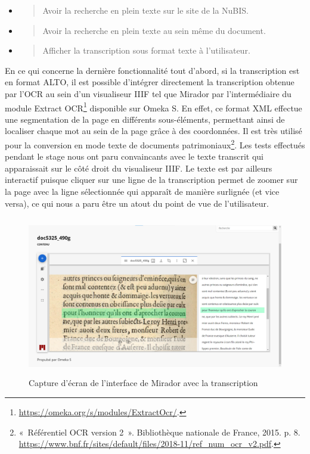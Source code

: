\documentclass[a4paper,12pt,twoside]{book}
\begin{document}
\begin{itemize}
	\item
	\begin{quote}
		Avoir la recherche en plein texte sur le site de la NuBIS.
	\end{quote}
	\item
	\begin{quote}
		Avoir la recherche en plein texte au sein même du document.
	\end{quote}
	\item
	\begin{quote}
		Afficher la transcription sous format texte à l'utilisateur. \\
	\end{quote}
\end{itemize}

En ce qui concerne la dernière fonctionnalité tout d'abord, si la
transcription est en format ALTO, il est possible d'intégrer directement
la transcription obtenue par l'OCR au sein d'un visualiseur IIIF tel que
Mirador par l'intermédiaire du module Extract OCR\footnote{\url{https://omeka.org/s/modules/ExtractOcr/}.}
disponible sur Omeka S. En effet, ce format XML effectue une
segmentation de la page en différents sous-éléments, permettant ainsi de
localiser chaque mot au sein de la page grâce à des coordonnées. Il est
très utilisé pour la conversion en mode texte de documents
patrimoniaux\footnote{«~Référentiel OCR version 2~». Bibliothèque
	nationale de France, 2015. p. 8.
	\url{https://www.bnf.fr/sites/default/files/2018-11/ref_num_ocr_v2.pdf}.}.
Les tests effectués pendant le stage nous ont paru convaincants avec le
texte transcrit qui apparaissait sur le côté droit du visualiseur IIIF.
Le texte est par ailleurs interactif puisque cliquer sur une ligne de la
transcription permet de zoomer sur la page avec la ligne sélectionnée
qui apparaît de manière surlignée (et vice versa), ce qui nous a paru
être un atout du point de vue de l'utilisateur. \\

\begin{figure} [H]
	\includegraphics[width=6.21736in,height=2.74514in]{vertopal_157ae480aa4a4b07be198b586a812241/media/image15.png}
	\caption{Capture d'écran de l'interface de Mirador avec la transcription}
\end{figure}
\end{document}
